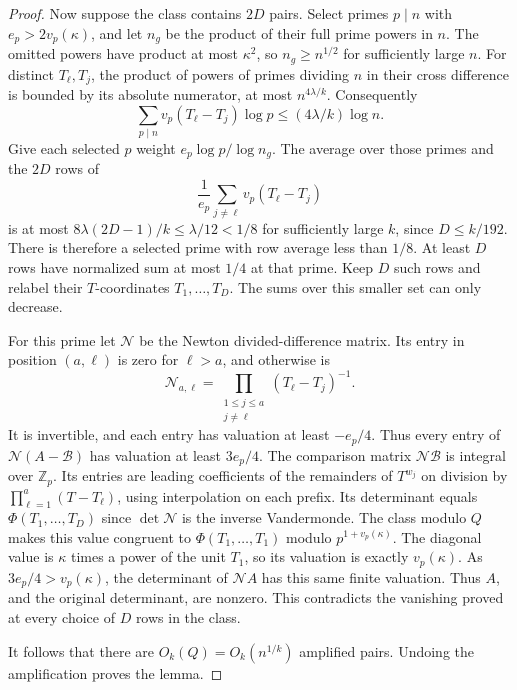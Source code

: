 \documentclass[11pt,reqno]{amsart}
\begin{document}
\begin{proof}
Now suppose the class contains \(2D\) pairs. Select primes
\(p\mid n\) with \(e_p>2v_p(\kappa)\), and let \(n_g\)
be the product of their full prime powers in \(n\).
The omitted powers have product at most \(\kappa^2\),
so \(n_g\ge n^{1/2}\) for sufficiently large \(n\).
For distinct \(T_\ell,T_j\), the product of powers of
primes dividing \(n\) in their cross difference is bounded
by its absolute numerator, at most \(n^{4\lambda/k}\).
Consequently
\[
 \sum_{p\mid n}v_p(T_\ell-T_j)\log p
                  \le (4\lambda/k)\log n .
\]
Give each selected \(p\) weight \(e_p\log p/\log n_g\).
The average over those primes and the \(2D\) rows of
\[
 \frac{1}{e_p}\sum_{j\ne\ell}v_p(T_\ell-T_j)
\]
is at most \(8\lambda(2D-1)/k\le\lambda/12<1/8\)
for sufficiently large \(k\), since \(D\le k/192\).
There is therefore a selected prime with row average
less than \(1/8\). At least \(D\) rows have normalized
sum at most \(1/4\) at that prime.
Keep \(D\) such rows and relabel their \(T\)-coordinates
\(T_1,\ldots,T_D\). The sums over this smaller set can
only decrease.

For this prime let \(\mathcal N\) be the Newton
divided-difference matrix. Its entry in position \((a,\ell)\)
is zero for \(\ell>a\), and otherwise is
\[
 \mathcal N_{a,\ell}=
 \prod_{\substack{1\le j\le a\\j\ne\ell}}(T_\ell-T_j)^{-1}.
\]
It is invertible, and each entry has valuation at least
\(-e_p/4\). Thus every entry of \(\mathcal N(A-\mathcal B)\)
has valuation at least \(3e_p/4\).
The comparison matrix \(\mathcal N\mathcal B\) is integral over
\(\mathbb Z_p\). Its entries are leading coefficients of the
remainders of \(T^{w_j}\) on division by
\(\prod_{\ell=1}^a(T-T_\ell)\), using interpolation on each
prefix. Its determinant equals \(\Phi(T_1,\ldots,T_D)\)
since \(\det\mathcal N\) is the inverse Vandermonde.
The class modulo \(Q\) makes this value congruent to
\(\Phi(T_1,\ldots,T_1)\) modulo \(p^{1+v_p(\kappa)}\).
The diagonal value is \(\kappa\) times a power of the unit
\(T_1\), so its valuation is exactly \(v_p(\kappa)\).
As \(3e_p/4>v_p(\kappa)\), the determinant of \(\mathcal N A\)
has this same finite valuation. Thus \(A\), and the
original determinant, are nonzero. This contradicts the
vanishing proved at every choice of \(D\) rows in the class.

It follows that there are \(O_k(Q)=O_k(n^{1/k})\)
amplified pairs. Undoing the amplification proves the lemma.
\end{proof}
\end{document}
